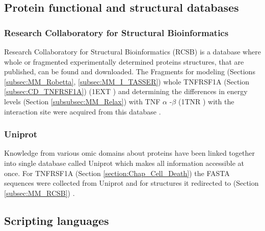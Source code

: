 \subsection{Protein functional and structural databases}

\subsubsection{Research Collaboratory for Structural Bioinformatics}
Research Collaboratory for Structural Bioinformatics (RCSB) is a database where whole or fragmented experimentally determined proteins structures, that are published, can be found and downloaded. The Fragments for modeling (Sections \ref{subsec:MM_Robetta}, \ref{subsec:MM_I_TASSER}) whole TNFRSF1A (Section \ref{subsec:CD_TNFRSF1A}) (1EXT \cite{naismith_structures_1996}) and determining the differences in energy levels (Section \ref{subsubsec:MM_Relax}) with TNF $\alpha$ -$\beta$ (1TNR \cite{banner_crystal_1993}) with the interaction site were acquired from this database \cite{burley_rcsb_2018}.
\label{subsec:MM_RCSB}

\subsubsection{Uniprot}
Knowledge from various omic domains about proteins have been linked together into single database called Uniprot which makes all information accessible at once. For TNFRSF1A (Section \ref{section:Chap_Cell_Death}) the FASTA sequences were collected from Uniprot and for structures it redirected to (Section \ref{subsec:MM_RCSB}) \cite{the_uniprot_consortium_uniprot:_2015}.
\label{subsec:MM_Uniprot}

\subsection{Scripting languages}

